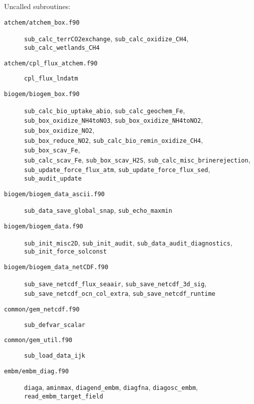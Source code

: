 \documentclass[a4paper,10pt,article]{memoir}
\begin{document}
Uncalled subroutines:
\begin{description}
  \item[\texttt{atchem/atchem\_box.f90}]{\texttt{sub\_calc\_terrCO2exchange},
    \texttt{sub\_calc\_oxidize\_CH4}, \\
    \texttt{sub\_calc\_wetlands\_CH4}}

  \item[\texttt{atchem/cpl\_flux\_atchem.f90}]{\texttt{cpl\_flux\_lndatm}}

  \item[\texttt{biogem/biogem\_box.f90}]{
    \texttt{sub\_calc\_bio\_uptake\_abio},
    \texttt{sub\_calc\_geochem\_Fe}, \\
    \texttt{sub\_box\_oxidize\_NH4toNO3},
    \texttt{sub\_box\_oxidize\_NH4toNO2},
    \texttt{sub\_box\_oxidize\_NO2}, \\ \texttt{sub\_box\_reduce\_NO2},
    \texttt{sub\_calc\_bio\_remin\_oxidize\_CH4},
    \texttt{sub\_box\_scav\_Fe}, \\ \texttt{sub\_calc\_scav\_Fe},
    \texttt{sub\_box\_scav\_H2S},
    \texttt{sub\_calc\_misc\_brinerejection}, \\
    \texttt{sub\_update\_force\_flux\_atm},
    \texttt{sub\_update\_force\_flux\_sed},
    \texttt{sub\_audit\_update}}

  \item[\texttt{biogem/biogem\_data\_ascii.f90}]{
    \texttt{sub\_data\_save\_global\_snap},
    \texttt{sub\_echo\_maxmin}}

  \item[\texttt{biogem/biogem\_data.f90}]{\texttt{sub\_init\_misc2D},
    \texttt{sub\_init\_audit}, \texttt{sub\_data\_audit\_diagnostics},
    \texttt{sub\_init\_force\_solconst}}

  \item[\texttt{biogem/biogem\_data\_netCDF.f90}]{
    \texttt{sub\_save\_netcdf\_flux\_seaair},
    \texttt{sub\_save\_netcdf\_3d\_sig}, \\
    \texttt{sub\_save\_netcdf\_ocn\_col\_extra},
    \texttt{sub\_save\_netcdf\_runtime}}

  \item[\texttt{common/gem\_netcdf.f90}]{\texttt{sub\_defvar\_scalar}}

  \item[\texttt{common/gem\_util.f90}]{\texttt{sub\_load\_data\_ijk}}

  \item[\texttt{embm/embm\_diag.f90}]{\texttt{diaga}, \texttt{aminmax},
    \texttt{diagend\_embm}, \texttt{diagfna}, \texttt{diagosc\_embm}, \\
    \texttt{read\_embm\_target\_field}}


\end{description}
\end{document}
